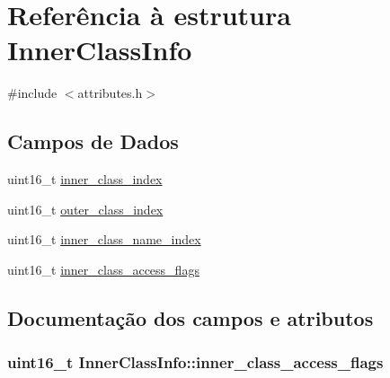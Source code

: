 \hypertarget{structInnerClassInfo}{}\section{Referência à estrutura Inner\+Class\+Info}
\label{structInnerClassInfo}


{\ttfamily \#include $<$attributes.\+h$>$}

\subsection*{Campos de Dados}
\begin{DoxyCompactItemize}
\item 
uint16\+\_\+t \hyperlink{structInnerClassInfo_a3383bc5bea2999b6bd91b9dfc095264f}{inner\+\_\+class\+\_\+index}
\item 
uint16\+\_\+t \hyperlink{structInnerClassInfo_a8449c27dc3cac6e437f4e1c1132ea229}{outer\+\_\+class\+\_\+index}
\item 
uint16\+\_\+t \hyperlink{structInnerClassInfo_a6d008047cb2df8aa856666169f625026}{inner\+\_\+class\+\_\+name\+\_\+index}
\item 
uint16\+\_\+t \hyperlink{structInnerClassInfo_a3810439736cc7ad5cdd1d2cb7aa7c885}{inner\+\_\+class\+\_\+access\+\_\+flags}
\end{DoxyCompactItemize}


\subsection{Documentação dos campos e atributos}
\subsubsection[{\texorpdfstring{inner\+\_\+class\+\_\+access\+\_\+flags}{inner_class_access_flags}}]{\setlength{\rightskip}{0pt plus 5cm}uint16\+\_\+t Inner\+Class\+Info\+::inner\+\_\+class\+\_\+access\+\_\+flags}\hypertarget{structInnerClassInfo_a3810439736cc7ad5cdd1d2cb7aa7c885}{}\label{structInnerClassInfo_a3810439736cc7ad5cdd1d2cb7aa7c885}
